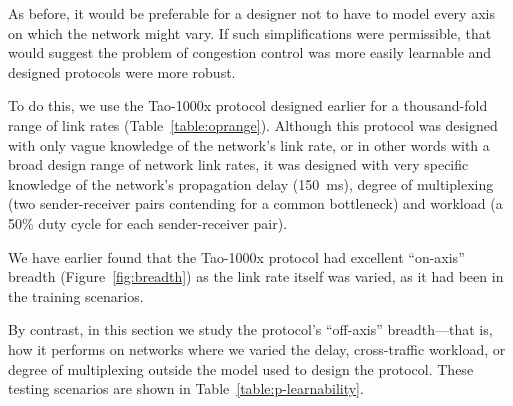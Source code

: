 As before, it would be preferable for a designer not to have to
model every axis on which the network might vary. If such simplifications
were permissible, that would suggest the problem of congestion control
was more easily learnable and designed protocols were more robust.

To do this, we use the Tao-1000x protocol designed earlier for a
thousand-fold range of link rates
(Table~\ref{table:oprange}). Although this protocol was designed with
only vague knowledge of the network's link rate, or in other words
with a broad design range of network link rates, it was designed with
very specific knowledge of the network's propagation delay (150~ms),
degree of multiplexing (two sender-receiver pairs contending for a
common bottleneck) and workload (a 50\% duty cycle for each
sender-receiver pair).

We have earlier found that the Tao-1000x protocol had excellent
``on-axis'' breadth (Figure~\ref{fig:breadth}) as the link rate itself
was varied, as it had been in the training scenarios.

By contrast, in this section we study the protocol's ``off-axis''
breadth---that is, how it performs on networks where we varied the
delay, cross-traffic workload, or degree of multiplexing outside the
model used to design the protocol. These testing scenarios are shown
in Table~\ref{table:p-learnability}.

\renewcommand{\columnwidth}{6 in}
\renewcommand{\textwidth}{6 in}

